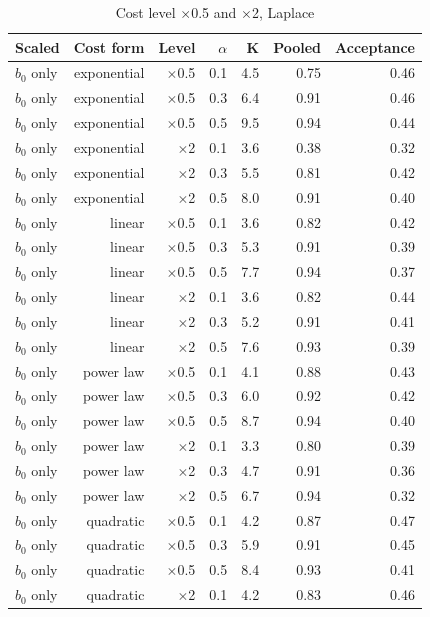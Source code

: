\begin{table}[htbp]
\centering
\caption{Cost level $\times$0.5 and $\times$2, Laplace}
\label{tab:a10b_cost_levels}
\small
\begin{tabular}{lrrrrrr}
\toprule
Scaled & Cost form & Level & $\alpha$ & K & Pooled & Acceptance \\
\midrule
$b_0$ only & exponential & $\times$0.5 & 0.1 & 4.5 & 0.75 & 0.46 \\
$b_0$ only & exponential & $\times$0.5 & 0.3 & 6.4 & 0.91 & 0.46 \\
$b_0$ only & exponential & $\times$0.5 & 0.5 & 9.5 & 0.94 & 0.44 \\
$b_0$ only & exponential & $\times$2 & 0.1 & 3.6 & 0.38 & 0.32 \\
$b_0$ only & exponential & $\times$2 & 0.3 & 5.5 & 0.81 & 0.42 \\
$b_0$ only & exponential & $\times$2 & 0.5 & 8.0 & 0.91 & 0.40 \\
$b_0$ only & linear & $\times$0.5 & 0.1 & 3.6 & 0.82 & 0.42 \\
$b_0$ only & linear & $\times$0.5 & 0.3 & 5.3 & 0.91 & 0.39 \\
$b_0$ only & linear & $\times$0.5 & 0.5 & 7.7 & 0.94 & 0.37 \\
$b_0$ only & linear & $\times$2 & 0.1 & 3.6 & 0.82 & 0.44 \\
$b_0$ only & linear & $\times$2 & 0.3 & 5.2 & 0.91 & 0.41 \\
$b_0$ only & linear & $\times$2 & 0.5 & 7.6 & 0.93 & 0.39 \\
$b_0$ only & power law & $\times$0.5 & 0.1 & 4.1 & 0.88 & 0.43 \\
$b_0$ only & power law & $\times$0.5 & 0.3 & 6.0 & 0.92 & 0.42 \\
$b_0$ only & power law & $\times$0.5 & 0.5 & 8.7 & 0.94 & 0.40 \\
$b_0$ only & power law & $\times$2 & 0.1 & 3.3 & 0.80 & 0.39 \\
$b_0$ only & power law & $\times$2 & 0.3 & 4.7 & 0.91 & 0.36 \\
$b_0$ only & power law & $\times$2 & 0.5 & 6.7 & 0.94 & 0.32 \\
$b_0$ only & quadratic & $\times$0.5 & 0.1 & 4.2 & 0.87 & 0.47 \\
$b_0$ only & quadratic & $\times$0.5 & 0.3 & 5.9 & 0.91 & 0.45 \\
$b_0$ only & quadratic & $\times$0.5 & 0.5 & 8.4 & 0.93 & 0.41 \\
$b_0$ only & quadratic & $\times$2 & 0.1 & 4.2 & 0.83 & 0.46 \\

\end{tabular}
\end{table}
